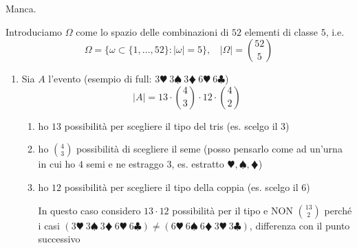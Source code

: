 \Soluzione

Manca.

\Soluzione

Introduciamo $\Omega $ come lo spazio delle combinazioni di $52$ elementi di classe $5$, i.e.
\begin{equation*}
	\Omega =\{\omega \subset \{1,\dots ,52\} : |\omega| =5\} ,\ \ \ \ |\Omega| =\binom{52}{5}
\end{equation*}
\begin{enumerate}
	\item Sia $A$ l'evento  (esempio di full: $3\varheartsuit \ 3\spadesuit \ 3\vardiamondsuit \ 6\varheartsuit \ 6\clubsuit $)\begin{equation*}
	| A| =13\cdot \binom{4}{3} \cdot 12\cdot \binom{4}{2}
	\end{equation*}
	\begin{enumerate}
		\item ho $13$ possibilità per scegliere il tipo del tris (es. scelgo il $3$)
		\item ho $\binom{4}{3}$ possibilità di scegliere il seme (posso pensarlo come ad un'urna in cui ho $4$ semi e ne estraggo $3$, es. estratto $\varheartsuit ,\spadesuit ,\vardiamondsuit $)
		\item ho $12$ possibilità per scegliere il tipo della coppia (es. scelgo il $6$)

		\begin{rem}
			In questo caso considero $13\cdot 12$ possibilità per il tipo e NON $\binom{13}{2}$ perché i casi $(3\varheartsuit \ 3\spadesuit \ 3\vardiamondsuit \ 6\varheartsuit \ 6\clubsuit) \neq (6\varheartsuit \ 6\spadesuit \ 6\vardiamondsuit \ 3\varheartsuit \ 3\clubsuit)$, differenza con il punto successivo
		\end{rem}


\end{enumerate}
\end{enumerate}
